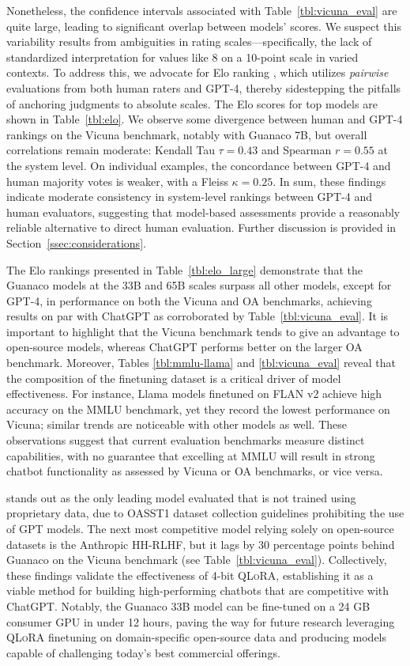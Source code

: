 Nonetheless, the confidence intervals associated with Table~\ref{tbl:vicuna_eval} are quite large, leading to significant overlap between models’ scores. We suspect this variability results from ambiguities in rating scales—specifically, the lack of standardized interpretation for values like 8 on a 10-point scale in varied contexts. To address this, we advocate for Elo ranking \citep{elo1967proposed}, which utilizes \textit{pairwise} evaluations from both human raters and GPT-4, thereby sidestepping the pitfalls of anchoring judgments to absolute scales. The Elo scores for top models are shown in Table~\ref{tbl:elo}. We observe some divergence between human and GPT-4 rankings on the Vicuna benchmark, notably with Guanaco 7B, but overall correlations remain moderate: Kendall Tau $\tau=0.43$ and Spearman $r=0.55$ at the system level. On individual examples, the concordance between GPT-4 and human majority votes is weaker, with a Fleiss $\kappa=0.25$. In sum, these findings indicate moderate consistency in system-level rankings between GPT-4 and human evaluators, suggesting that model-based assessments provide a reasonably reliable alternative to direct human evaluation. Further discussion is provided in Section~\ref{ssec:considerations}.

The Elo rankings presented in Table~\ref{tbl:elo_large} demonstrate that the {Guanaco} models at the 33B and 65B scales surpass all other models, except for GPT-4, in performance on both the Vicuna and OA benchmarks, achieving results on par with ChatGPT as corroborated by Table~\ref{tbl:vicuna_eval}. It is important to highlight that the Vicuna benchmark tends to give an advantage to open-source models, whereas ChatGPT performs better on the larger OA benchmark. Moreover, Tables \ref{tbl:mmlu-llama} and \ref{tbl:vicuna_eval} reveal that the composition of the finetuning dataset is a critical driver of model effectiveness. For instance, Llama models finetuned on FLAN v2 achieve high accuracy on the MMLU benchmark, yet they record the lowest performance on Vicuna; similar trends are noticeable with other models as well. These observations suggest that current evaluation benchmarks measure distinct capabilities, with no guarantee that excelling at MMLU will result in strong chatbot functionality as assessed by Vicuna or OA benchmarks, or vice versa.

 stands out as the only leading model evaluated that is not trained using proprietary data, due to OASST1 dataset collection guidelines prohibiting the use of GPT models. The next most competitive model relying solely on open-source datasets is the Anthropic HH-RLHF, but it lags by 30 percentage points behind {Guanaco} on the Vicuna benchmark (see Table~\ref{tbl:vicuna_eval}). Collectively, these findings validate the effectiveness of 4-bit \textsc{QLoRA}, establishing it as a viable method for building high-performing chatbots that are competitive with ChatGPT. Notably, the {Guanaco} 33B model can be fine-tuned on a 24 GB consumer GPU in under 12 hours, paving the way for future research leveraging \textsc{QLoRA} finetuning on domain-specific open-source data and producing models capable of challenging today’s best commercial offerings.

